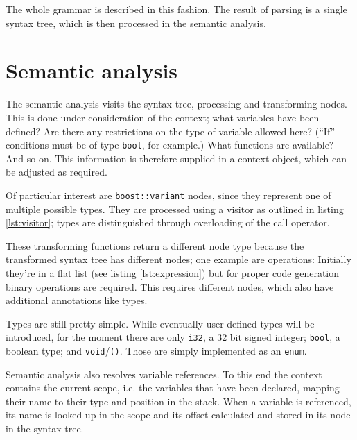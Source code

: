 		
		The whole grammar is described in this fashion. The result of parsing is a single syntax tree, which is then processed in the semantic analysis.
	
	\section{Semantic analysis}
		
		The semantic analysis visits the syntax tree, processing and transforming nodes. This is done under consideration of the context; what variables have been defined? Are there any restrictions on the type of variable allowed here? (``If'' conditions must be of type \lstinline$bool$, for example.) What functions are available? And so on. This information is therefore supplied in a context object, which can be adjusted as required.
		
		Of particular interest are \lstinline$boost::variant$ nodes, since they represent one of multiple possible types. They are processed using a visitor as outlined in listing \ref{lst:visitor}; types are distinguished through overloading of the call operator.
		
		
		These transforming functions return a different node type because the transformed syntax tree has different nodes; one example are operations: Initially they're in a flat list (see listing \ref{lst:expression}) but for proper code generation binary operations are required. This requires different nodes, which also have additional annotations like types.
		
		Types are still pretty simple. While eventually user-defined types will be introduced, for the moment there are only \lstinline$i32$, a 32 bit signed integer; \lstinline$bool$, a boolean type; and \lstinline$void$/\lstinline$()$. Those are simply implemented as an \lstinline$enum$.
		
		Semantic analysis also resolves variable references. To this end the context contains the current scope, i.e. the variables that have been declared, mapping their name to their type and position in the stack. When a variable is referenced, its name is looked up in the scope and its offset calculated and stored in its node in the syntax tree.
		
